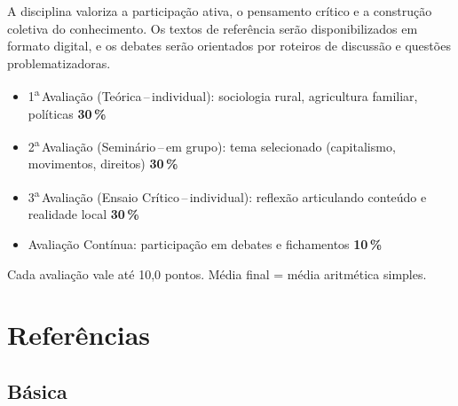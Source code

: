 \documentclass[11pt,a4paper]{article}
\begin{document}
A disciplina valoriza a participação ativa, o pensamento crítico e a construção coletiva do conhecimento. Os textos de referência serão disponibilizados em formato digital, e os debates serão orientados por roteiros de discussão e questões problematizadoras.


\begin{tcolorbox}[uefsbox, colframe=uefsaccent, colback=white, title={\bfseries\color{white}\scshape Avaliação}, fonttitle=\normalsize, coltitle=white, colbacktitle=uefsaccent, attach boxed title to top left={yshift=-2mm,xshift=2mm}, boxed title style={arc=2pt,boxrule=0pt}]
\begin{itemize}[leftmargin=1.2em]
\item 1\textsuperscript{a}\,Avaliação (Teórica\,--\,individual): sociologia rural, agricultura familiar, políticas\,\dotfill\,\textbf{30\,\%}
\item 2\textsuperscript{a}\,Avaliação (Seminário\,--\,em grupo): tema selecionado (capitalismo, movimentos, direitos)\,\dotfill\,\textbf{30\,\%}
\item 3\textsuperscript{a}\,Avaliação (Ensaio Crítico\,--\,individual): reflexão articulando conteúdo e realidade local\,\dotfill\,\textbf{30\,\%}
\item Avaliação Contínua: participação em debates e fichamentos\,\dotfill\,\textbf{10\,\%}
\end{itemize}
\vspace{4pt}
{\footnotesize Cada avaliação vale até 10,0 pontos. Média final = média aritmética simples.}
\end{tcolorbox}



\section*{Referências}

\subsection*{Básica}
\end{document}
